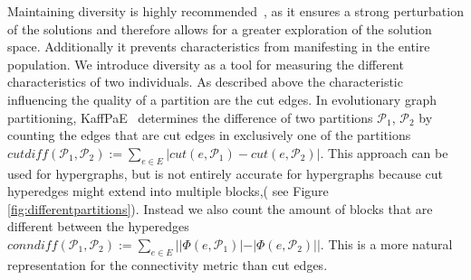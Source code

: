 \documentclass[a4paper,12pt,titlepage, BCOR7mm,headsepline]{scrbook}
\numberwithin{equation}{section}
\begin{document}
Maintaining diversity is highly recommended~\cite{back1996evolutionary}, as it ensures a strong perturbation of the solutions and therefore allows for a greater exploration of the solution space.
Additionally it prevents characteristics from manifesting in the entire population.
We introduce diversity as a tool for measuring the different characteristics of two individuals. 
As described above the characteristic influencing the quality of a partition are the cut edges. In evolutionary graph partitioning, KaffPaE~\cite{sanders2012distributed} determines the difference of two partitions $\mathcal{P}_1$, $\mathcal{P}_2$ by counting the edges that are cut edges in exclusively one of the partitions $cutdiff(\mathcal{P}_1,\mathcal{P}_2) :=\sum_{e \in E} |cut(e,\mathcal{P}_1) - cut(e,\mathcal{P}_2)|$. This approach can be used for hypergraphs, but is not entirely accurate for hypergraphs because cut hyperedges might extend into multiple blocks,( see Figure \ref{fig:differentpartitions}). Instead we also count the amount of blocks that are different between the hyperedges $conndiff(\mathcal{P}_1,\mathcal{P}_2) :=\sum_{e \in E} ||\Phi(e,\mathcal{P}_1)| - |\Phi(e,\mathcal{P}_2)||$. This is a more natural representation for the connectivity metric than cut edges.
\end{document}
